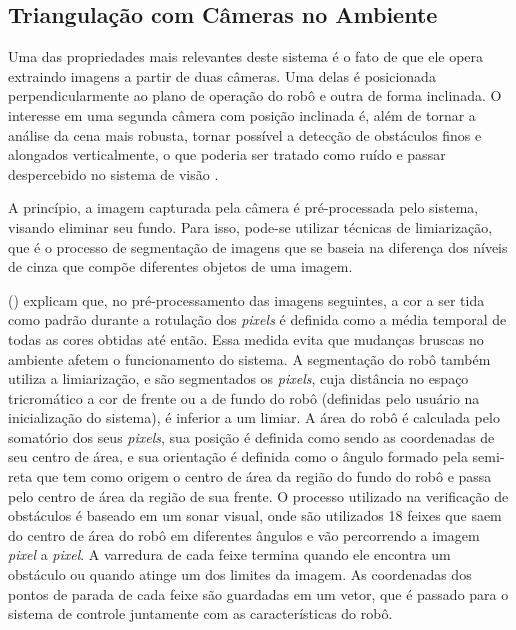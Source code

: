 \subsection{Triangulação com Câmeras no Ambiente}
\label{subsec:triangulacao}

Uma das propriedades mais relevantes deste sistema é o fato de que ele opera extraindo imagens a partir de duas câmeras. Uma delas é posicionada perpendicularmente ao plano de operação do robô e outra de forma inclinada. O interesse em uma segunda câmera com posição inclinada é, além de tornar a análise da cena mais robusta, tornar possível a detecção de obstáculos finos e alongados verticalmente, o que poderia ser tratado como ruído e passar despercebido no sistema de visão \cite{andrade2006sistema}.

A princípio, a imagem capturada pela câmera é pré-processada pelo sistema, visando eliminar seu fundo. Para isso, pode-se utilizar técnicas de limiarização, que é o processo de segmentação de imagens que se baseia na diferença dos níveis de cinza que compõe diferentes objetos de uma imagem.

\citeauthor{andrade2006sistema} (\citeyear{andrade2006sistema}) explicam que, no pré-processamento das imagens seguintes, a cor a ser tida como padrão durante a rotulação dos \textit{pixels} é definida como a média temporal de todas as cores obtidas até então. Essa medida evita que mudanças bruscas no ambiente afetem o funcionamento do sistema. A segmentação do robô também utiliza a limiarização, e são segmentados os \textit{pixels}, cuja distância no espaço tricromático a cor de frente ou a de fundo do robô (definidas pelo usuário na inicialização do sistema), é inferior a um limiar. A área do robô é calculada pelo somatório dos seus \textit{pixels}, sua posição é definida como sendo as coordenadas de seu centro de área, e sua orientação é definida como o ângulo formado pela semi-reta que tem como origem o centro de área da região do fundo do robô e passa pelo centro de área da região de sua frente. O processo utilizado na verificação de obstáculos é baseado em um sonar visual, onde são utilizados 18 feixes que saem do centro de área do robô em diferentes ângulos e vão percorrendo a imagem \textit{pixel} a \textit{pixel}. A varredura de cada feixe termina quando ele encontra um obstáculo ou quando atinge um dos limites da imagem. As coordenadas dos pontos de parada de cada feixe são guardadas em um vetor, que é passado para o sistema de controle juntamente com as características do robô.

